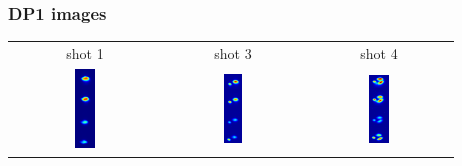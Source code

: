 \documentclass{beamer}
\begin{document}
\begin{frame}
\frametitle{DP1 images}

\begin{center}
\begin{tabular}{ccc}
shot 1 & shot 3 & shot 4 \hspace{2.0cm}\\
\includegraphics[width=0.14\textwidth]{dp1_1.png} &
\includegraphics[width=0.14\textwidth]{dp1_2.png} &
\includegraphics[width=0.14\textwidth]{dp1_3.png} \\
\end{tabular}
\end{center}

\end{frame}
\end{document}
